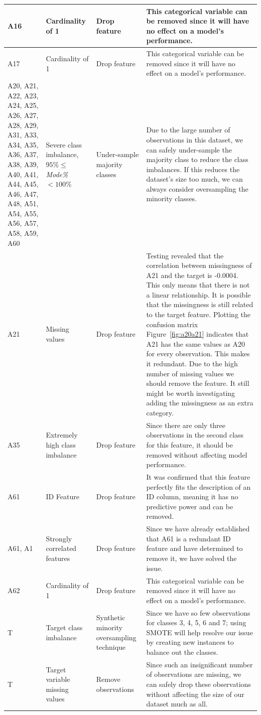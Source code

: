 \documentclass[11pt]{article}
\begin{document}
\begin{longtable}{|p{1.7cm}|p{4cm}|p{3cm}|p{6cm}|}
	A16 & Cardinality of 1 & Drop feature & This categorical variable can be removed since it will have no effect on a model's performance. \\ \hline
	A17 & Cardinality of 1 & Drop feature & This categorical variable can be removed since it will have no effect on a model's performance. \\ \hline
	A20, A21, A22, A23, A24, A25, A26, A27, A28, A29, A31, A33, A34, A35, A36, A37, A38, A39, A40, A41, A44, A45, A46, A47, A48, A51, A54, A55, A56, A57, A58, A59, A60 & Severe class imbalance, $95\%\le$\textit{Mode\%} $< 100\%$ & Under-sample majority classes & Due to the large number of observations in this dataset, we can safely under-sample the majority class to reduce the class imbalances. If this reduces the dataset's size too much, we can always consider oversampling the minority classes. \\ \hline
	A21 & Missing values & Drop feature & Testing revealed that the correlation between missingness of A21 and the target is -0.0004. This only means that there is not a linear relationship. It is possible that the missingness is still related to the target feature. Plotting the confusion matrix Figure~\ref{fig:a20a21} indicates that A21 has the same values as A20 for every observation. This makes it redundant. Due to the high number of missing values we should remove the feature. It still might be worth investigating adding the missingness as an extra category. \\ \hline
	A35 & Extremely high class imbalance & Drop feature & Since there are only three observations in the second class for this feature, it should be removed without affecting model performance. \\ \hline
	A61 & ID Feature & Drop feature & It was confirmed that this feature perfectly fits the description of an ID column, meaning it has no predictive power and can be removed. \\ \hline
	A61, A1 & Strongly correlated features & Drop feature & Since we have already established that A61 is a redundant ID feature and have determined to remove it, we have solved the issue. \\ \hline
	A62 & Cardinality of 1 & Drop feature & This categorical variable can be removed since it will have no effect on a model's performance. \\ \hline
	T & Target class imbalance & Synthetic minority oversampling technique & Since we have so few observations for classes 3, 4, 5, 6 and 7; using SMOTE will help resolve our issue by creating new instances to balance out the classes.  \\ \hline
	T & Target variable missing values & Remove observations & Since such an insignificant number of observations are missing, we can safely drop these observations without affecting the size of our dataset much as all. \\ \hline
\end{longtable}
\end{document}
